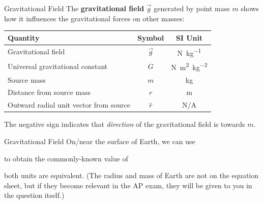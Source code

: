 \documentclass[12pt,compress,aspectratio=169]{beamer}
\begin{document}
\begin{frame}{Gravitational Field}
  The \textbf{gravitational field} $\vec g$ generated by point mass $m$
  shows how it influences the gravitational forces on other masses:

  \begin{center}
    \begin{tabular}{l|c|c}
      \rowcolor{pink}
      \textbf{Quantity} & \textbf{Symbol} & \textbf{SI Unit} \\ \hline
      Gravitational field       & $\vec g$ & \si{\newton\per\kilo\gram}\\
      Universal gravitational constant
      & $G$ & \si{\newton\metre\squared\per\kilo\gram\squared} \\
      Source mass               & $m$ & \si{\kilo\gram} \\
      Distance from source mass & $r$ & \si\metre \\
      Outward radial unit vector from source & $\hat r$ & N/A
    \end{tabular}
  \end{center}
  The negative sign indicates that \emph{direction} of the gravitational field
  is towards $m$.
\end{frame}



\begin{frame}{Gravitational Field}
  On/near the surface of Earth, we can use

  
  to obtain the commonly-known value of


  both units are equivalent. (The radius and mass of Earth are not on the
  equation sheet, but if they become relevant in the AP exam, they will be
  given to you in the question itself.)
\end{frame}
\end{document}
